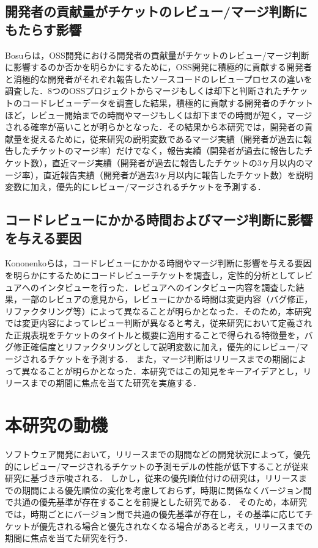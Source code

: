 \documentclass[submit]{ipsj}
\begin{document}
\subsection{開発者の貢献量がチケットのレビュー/マージ判断にもたらす影響}
Bosu\cite{review1}らは，OSS開発における開発者の貢献量がチケットのレビュー/マージ判断に影響するのか否かを明らかにするために，OSS開発に積極的に貢献する開発者と消極的な開発者がそれぞれ報告したソースコードのレビュープロセスの違いを調査した．8つのOSSプロジェクトからマージもしくは却下と判断されたチケットのコードレビューデータを調査した結果，積極的に貢献する開発者のチケットほど，レビュー開始までの時間やマージもしくは却下までの時間が短く，マージされる確率が高いことが明らかとなった．その結果から本研究では，開発者の貢献量を捉えるために，従来研究\cite{prioritizer}の説明変数であるマージ実績（開発者が過去に報告したチケットのマージ率）だけでなく，報告実績（開発者が過去に報告したチケット数），直近マージ実績（開発者が過去に報告したチケットの3ヶ月以内のマージ率），直近報告実績（開発者が過去3ヶ月以内に報告したチケット数）を説明変数に加え，優先的にレビュー/マージされるチケットを予測する．

\subsection{コードレビューにかかる時間およびマージ判断に影響を与える要因}
Kononenko\cite{release_merge}らは，コードレビューにかかる時間やマージ判断に影響を与える要因を明らかにするためにコードレビューチケットを調査し，定性的分析としてレビュアへのインタビューを行った．レビュアへのインタビュー内容を調査した結果，一部のレビュアの意見から，レビューにかかる時間は変更内容（バグ修正，リファクタリング等）によって異なることが明らかとなった．そのため，本研究では変更内容によってレビュー判断が異なると考え，従来研究\cite{bug}\cite{refactoring}において定義された正規表現をチケットのタイトルと概要に適用することで得られる特徴量を，バグ修正確信度とリファクタリングとして説明変数に加え，優先的にレビュー/マージされるチケットを予測する．
また，マージ判断はリリースまでの期間によって異なることが明らかとなった．本研究ではこの知見をキーアイデアとし，リリースまでの期間に焦点を当てた研究を実施する．

\section{本研究の動機}
ソフトウェア開発において，リリースまでの期間などの開発状況によって，優先的にレビュー/マージされるチケットの予測モデルの性能が低下することが従来研究\cite{release_merge}に基づき示唆される．
しかし，従来の優先順位付けの研究\cite{prioritizer}\cite{review_prioritize_pineapple}\cite{prioritize_azeem}\cite{prioritize_fan}は，リリースまでの期間による優先順位の変化を考慮しておらず，時期に関係なくバージョン間で共通の優先基準が存在することを前提とした研究である．
そのため，本研究では，時期ごとにバージョン間で共通の優先基準が存在し，その基準に応じてチケットが優先される場合と優先されなくなる場合があると考え，リリースまでの期間に焦点を当てた研究を行う．
\end{document}
